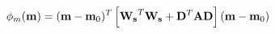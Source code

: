 \vspace{-0.1cm}
\begin{equation}
    \phi_m(\mathbf{m}) = (\mathbf{m} - \mathbf{m}_0)^T \left[ \mathbf{W_s}^T \mathbf{W_s} + \mathbf{D}^T \mathbf{A} \mathbf{D}\right] (\mathbf{m} - \mathbf{m}_0)
    \label{eq:discrete_rotation}
    \vspace{-0.05cm}
\end{equation}